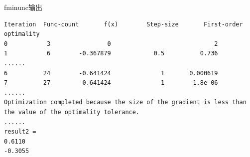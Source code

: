 \documentclass[12pt]{beamer}
\begin{document}
\begin{frame}[t,fragile]{fminunc输出}

\begin{lstlisting}
Iteration  Func-count       f(x)        Step-size       First-order optimality
0           3                0                             2
1           6        -0.367879            0.5          0.736  
......
6          24        -0.641424              1       0.000619  
7          27        -0.641424              1        1.8e-06
......
Optimization completed because the size of the gradient is less than the value of the optimality tolerance.
......
result2 =
0.6110
-0.3055
\end{lstlisting}

\end{frame}

 
\end{document}
